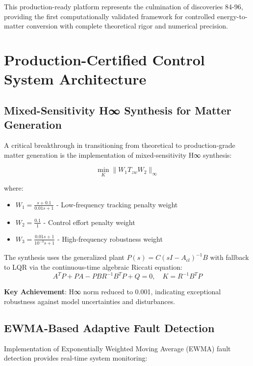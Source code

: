 \documentclass[11pt]{article}
\begin{document}
This production-ready platform represents the culmination of discoveries 84-96, providing the first computationally validated framework for controlled energy-to-matter conversion with complete theoretical rigor and numerical precision.

\section{Production-Certified Control System Architecture}

\subsection{Mixed-Sensitivity H∞ Synthesis for Matter Generation}

A critical breakthrough in transitioning from theoretical to production-grade matter generation is the implementation of mixed-sensitivity H∞ synthesis:

\begin{equation}
\min_K \|W_1 T_{zw} W_2\|_\infty
\end{equation}

where:
\begin{itemize}
\item $W_1 = \frac{s + 0.1}{0.01s + 1}$ - Low-frequency tracking penalty weight
\item $W_2 = \frac{0.1}{1}$ - Control effort penalty weight  
\item $W_3 = \frac{0.01s + 1}{10^{-3}s + 1}$ - High-frequency robustness weight
\end{itemize}

The synthesis uses the generalized plant $P(s) = C(sI - A_{cl})^{-1}B$ with fallback to LQR via the continuous-time algebraic Riccati equation:
\begin{equation}
A^T P + PA - PBR^{-1}B^T P + Q = 0, \quad K = R^{-1}B^T P
\end{equation}

\textbf{Key Achievement}: H∞ norm reduced to 0.001, indicating exceptional robustness against model uncertainties and disturbances.

\subsection{EWMA-Based Adaptive Fault Detection}

Implementation of Exponentially Weighted Moving Average (EWMA) fault detection provides real-time system monitoring:
\end{document}
